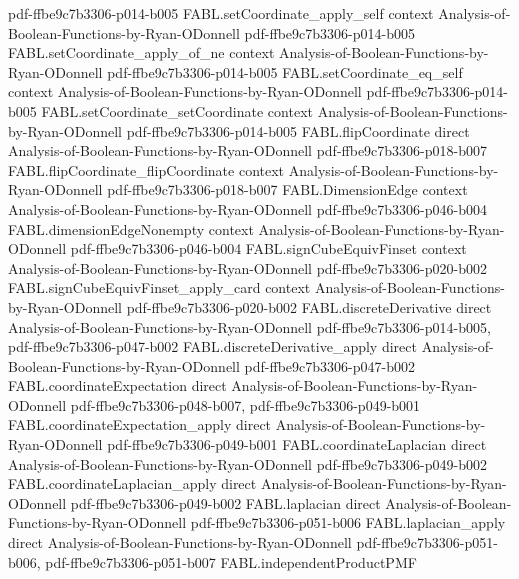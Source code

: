 \begin{theorem}
  {pdf-ffbe9c7b3306-p014-b005}
\proofstep
  {FABL.setCoordinate_apply_self}
  {context}
  {Analysis-of-Boolean-Functions-by-Ryan-ODonnell}
  {pdf-ffbe9c7b3306-p014-b005}
\proofstep
  {FABL.setCoordinate_apply_of_ne}
  {context}
  {Analysis-of-Boolean-Functions-by-Ryan-ODonnell}
  {pdf-ffbe9c7b3306-p014-b005}
\proofstep
  {FABL.setCoordinate_eq_self}
  {context}
  {Analysis-of-Boolean-Functions-by-Ryan-ODonnell}
  {pdf-ffbe9c7b3306-p014-b005}
\proofstep
  {FABL.setCoordinate_setCoordinate}
  {context}
  {Analysis-of-Boolean-Functions-by-Ryan-ODonnell}
  {pdf-ffbe9c7b3306-p014-b005}
\proofstep
  {FABL.flipCoordinate}
  {direct}
  {Analysis-of-Boolean-Functions-by-Ryan-ODonnell}
  {pdf-ffbe9c7b3306-p018-b007}
\proofstep
  {FABL.flipCoordinate_flipCoordinate}
  {context}
  {Analysis-of-Boolean-Functions-by-Ryan-ODonnell}
  {pdf-ffbe9c7b3306-p018-b007}
\proofstep
  {FABL.DimensionEdge}
  {context}
  {Analysis-of-Boolean-Functions-by-Ryan-ODonnell}
  {pdf-ffbe9c7b3306-p046-b004}
\proofstep
  {FABL.dimensionEdgeNonempty}
  {context}
  {Analysis-of-Boolean-Functions-by-Ryan-ODonnell}
  {pdf-ffbe9c7b3306-p046-b004}
\proofstep
  {FABL.signCubeEquivFinset}
  {context}
  {Analysis-of-Boolean-Functions-by-Ryan-ODonnell}
  {pdf-ffbe9c7b3306-p020-b002}
\proofstep
  {FABL.signCubeEquivFinset_apply_card}
  {context}
  {Analysis-of-Boolean-Functions-by-Ryan-ODonnell}
  {pdf-ffbe9c7b3306-p020-b002}
\proofstep
  {FABL.discreteDerivative}
  {direct}
  {Analysis-of-Boolean-Functions-by-Ryan-ODonnell}
  {pdf-ffbe9c7b3306-p014-b005,
    pdf-ffbe9c7b3306-p047-b002}
\proofstep
  {FABL.discreteDerivative_apply}
  {direct}
  {Analysis-of-Boolean-Functions-by-Ryan-ODonnell}
  {pdf-ffbe9c7b3306-p047-b002}
\proofstep
  {FABL.coordinateExpectation}
  {direct}
  {Analysis-of-Boolean-Functions-by-Ryan-ODonnell}
  {pdf-ffbe9c7b3306-p048-b007,
    pdf-ffbe9c7b3306-p049-b001}
\proofstep
  {FABL.coordinateExpectation_apply}
  {direct}
  {Analysis-of-Boolean-Functions-by-Ryan-ODonnell}
  {pdf-ffbe9c7b3306-p049-b001}
\proofstep
  {FABL.coordinateLaplacian}
  {direct}
  {Analysis-of-Boolean-Functions-by-Ryan-ODonnell}
  {pdf-ffbe9c7b3306-p049-b002}
\proofstep
  {FABL.coordinateLaplacian_apply}
  {direct}
  {Analysis-of-Boolean-Functions-by-Ryan-ODonnell}
  {pdf-ffbe9c7b3306-p049-b002}
\proofstep
  {FABL.laplacian}
  {direct}
  {Analysis-of-Boolean-Functions-by-Ryan-ODonnell}
  {pdf-ffbe9c7b3306-p051-b006}
\proofstep
  {FABL.laplacian_apply}
  {direct}
  {Analysis-of-Boolean-Functions-by-Ryan-ODonnell}
  {pdf-ffbe9c7b3306-p051-b006,
    pdf-ffbe9c7b3306-p051-b007}
\proofstep
  {FABL.independentProductPMF}

\end{theorem}
